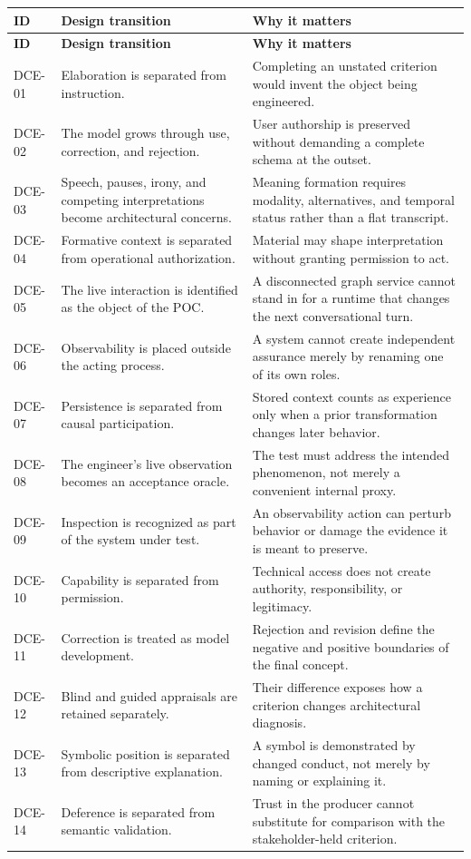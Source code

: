 \documentclass[10pt,a4paper]{article}
\begin{document}
\begin{longtable}{>{\raggedright\arraybackslash}p{}>{\raggedright\arraybackslash}p{}>{\raggedright\arraybackslash}p{}}
\hline
\textbf{ID} & \textbf{Design transition} & \textbf{Why it matters} \\
\hline
\endfirsthead
\hline
\textbf{ID} & \textbf{Design transition} & \textbf{Why it matters} \\
\hline
\endhead
DCE-01 & Elaboration is separated from instruction. & Completing an unstated criterion would invent the object being engineered. \\
DCE-02 & The model grows through use, correction, and rejection. & User authorship is preserved without demanding a complete schema at the outset. \\
DCE-03 & Speech, pauses, irony, and competing interpretations become architectural concerns. & Meaning formation requires modality, alternatives, and temporal status rather than a flat transcript. \\
DCE-04 & Formative context is separated from operational authorization. & Material may shape interpretation without granting permission to act. \\
DCE-05 & The live interaction is identified as the object of the POC. & A disconnected graph service cannot stand in for a runtime that changes the next conversational turn. \\
DCE-06 & Observability is placed outside the acting process. & A system cannot create independent assurance merely by renaming one of its own roles. \\
DCE-07 & Persistence is separated from causal participation. & Stored context counts as experience only when a prior transformation changes later behavior. \\
DCE-08 & The engineer's live observation becomes an acceptance oracle. & The test must address the intended phenomenon, not merely a convenient internal proxy. \\
DCE-09 & Inspection is recognized as part of the system under test. & An observability action can perturb behavior or damage the evidence it is meant to preserve. \\
DCE-10 & Capability is separated from permission. & Technical access does not create authority, responsibility, or legitimacy. \\
DCE-11 & Correction is treated as model development. & Rejection and revision define the negative and positive boundaries of the final concept. \\
DCE-12 & Blind and guided appraisals are retained separately. & Their difference exposes how a criterion changes architectural diagnosis. \\
DCE-13 & Symbolic position is separated from descriptive explanation. & A symbol is demonstrated by changed conduct, not merely by naming or explaining it. \\
DCE-14 & Deference is separated from semantic validation. & Trust in the producer cannot substitute for comparison with the stakeholder-held criterion. \\
\hline
\end{longtable}
\end{document}
